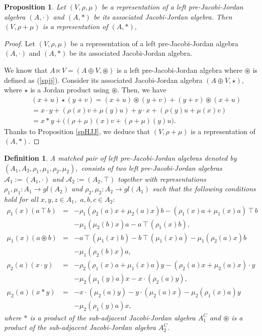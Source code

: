 \documentclass[12pt]{amsart}
\newtheorem{definition}[Theorem]{Definition}
\newtheorem{proposition}[Theorem]{Proposition}
\begin{document}
	\begin{proposition}\label{sumrl}
		Let $(V, \rho,\mu)$ be a representation of a left pre-Jacobi-Jordan algebra $(A,\cdot)$ and $(A,\ast)$
		be its associated Jacobi-Jordan algebra. Then
		$(V,\rho+\mu)$ is a representation of $(A,\ast),$
	\end{proposition}
	\begin{proof}
		Let $(V, \rho,\mu)$ be a representation of a left pre-Jacobi-Jordan algebra $(A,\cdot)$ and $(A,\ast)$ be its associated Jacobi-Jordan algebra.
		
		We know that $A\ltimes V=(A\oplus V,\circledast)$
		is a left pre-Jacobi-Jordan algebra where $\circledast$ is defined as (\ref{spjj}). Consider its associated Jacobi-Jordan algebra $(A\oplus V,\star),$
		where $\star$ is a Jordan product using $\circledast$. Then,	we have
		\begin{eqnarray}
			&&(x+u)\star (y+v)=(x+u)\circledast (y+v)+
			(y+v)\circledast (x+u)\nonumber\\
			&&=x\cdot y+(\rho(x)v+\mu(y)u)+
			y\cdot x+(\rho(y)u+\mu(x)v)\nonumber\\
			&&=x\ast y+\Big((\rho+\mu)(x)v+(\rho+\mu)(y)u \Big).\nonumber
		\end{eqnarray}
		Thanks to Proposition \ref{spHJJ}, we deduce that $(V,\rho+\mu)$ is a representation of $(A,\ast).$
	\end{proof}
	\begin{definition}
		A matched pair of left pre-Jacobi-Jordan algebras denoted by $(A_1,A_2,\rho_1,
		\mu_1,\rho_2,\mu_2),$ consists of two left pre-Jacobi-Jordan algebras $\mathcal{A}_1:=(A_1,\cdot)$ and 
		$\mathcal{A}_2:=(A_2,\top)$ together with representations $\rho_1, \mu_1: A_1\rightarrow gl(A_2)$ and 
		$\rho_2, \mu_2: A_2\rightarrow gl(A_1)$  such that the following conditions hold for all $x,y,z\in A_1,$ $a,b,c\in A_2:$  
		\begin{eqnarray}
			\rho_1(x)(a\intercal b)&=&-\rho_1(\rho_2(a)x+\mu_2(a)x)b-(\rho_1(x)a+
			\mu_1(x)a)\intercal b\nonumber\\
			&&-\mu_1(\mu_2(b)x)a-a\intercal(\rho_1(x)b),\label{mppHJJ1}\\
			\mu_1(x)(a\circledast b)&=&-a\intercal(\mu_1(x)b)-b\intercal(\mu_1(x)a)
			-\mu_1(\rho_2(a)x)b\nonumber\\
			&&-\mu_1(\rho_2(b)x)a,\label{mppHJJ2}\\
			\rho_2(a)(x\cdot y)&=&-\rho_2(\rho_1(x)a+\mu_1(x)a)y-(\rho_2(a)x+
			\mu_2(a)x)\cdot y\nonumber\\
			&&-\mu_2(\mu_1(y)a)x-x\cdot(\rho_2(a)y),\label{mppHJJ3}\\
			\mu_2(a)(x\ast y)&=&-x\cdot(\mu_2(a)
			y)-y\cdot(\mu_2(a)x)
			-\mu_2(\rho_1(x)a)y\nonumber\\
			&&-\mu_2(\rho_1(y)a)x,\label{mppHJJ4}
		\end{eqnarray}
		where $\ast$ is a product of the sub-adjacent Jacobi-Jordan algebra $A_1^C$ and $\circledast$ is a product of the sub-adjacent Jacobi-Jordan algebra $A_2^C.$
	\end{definition}
\end{document}
